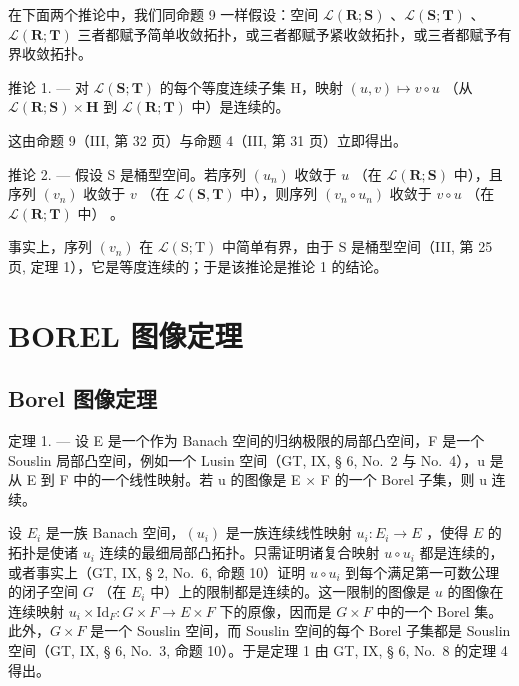 在下面两个推论中，我们同命题 9 一样假设：空间 \(\mathcal{L}(\mathbf{R};\mathbf{S})\) 、\(\mathcal{L}(\mathbf{S};\mathbf{T})\) 、\(\mathcal{L}(\mathbf{R};\mathbf{T})\) 三者都赋予简单收敛拓扑，或三者都赋予紧收敛拓扑，或三者都赋予有界收敛拓扑。

推论 1. --- 对 \(\mathcal{L}(\mathbf{S};\mathbf{T})\) 的每个等度连续子集 H，映射 \((u,v)\mapsto v\circ u\) （从 \(\mathcal{L}(\mathbf{R};\mathbf{S})\times \mathbf{H}\) 到 \(\mathcal{L}(\mathbf{R};\mathbf{T})\) 中）是连续的。

这由命题 9（III, 第 32 页）与命题 4（III, 第 31 页）立即得出。

推论 2. --- 假设 S 是桶型空间。若序列 \((u_n)\) 收敛于 \(u\) （在 \(\mathcal{L}(\mathbf{R};\mathbf{S})\) 中），且序列 \((v_{n})\) 收敛于 \(v\) （在 \(\mathcal{L}(\mathbf{S},\mathbf{T})\) 中），则序列 \((v_{n}\circ u_{n})\) 收敛于 \(v\circ u\) （在 \(\mathcal{L}(\mathbf{R};\mathbf{T})\) 中） 。

事实上，序列 \((v_{n})\) 在 \(\mathcal{L}(\mathrm{S};\mathrm{T})\) 中简单有界，由于 \(\mathrm{S}\) 是桶型空间（III, 第 25 页, 定理 1），它是等度连续的；于是该推论是推论 1 的结论。

\section{BOREL 图像定理}

\subsection{Borel 图像定理}

定理 1. --- 设 E 是一个作为 Banach 空间的归纳极限的局部凸空间，F 是一个 Souslin 局部凸空间，例如一个 Lusin 空间（GT, IX, § 6, No.~2 与 No.~4），u 是从 E 到 F 中的一个线性映射。若 u 的图像是 E × F 的一个 Borel 子集，则 u 连续。

设 \(E_i\) 是一族 Banach 空间，\((u_i)\) 是一族连续线性映射 \(u_i: E_i \to E\) ，使得 \(E\) 的拓扑是使诸 \(u_i\) 连续的最细局部凸拓扑。只需证明诸复合映射 \(u \circ u_i\) 都是连续的，或者事实上（GT, IX, § 2, No.~6, 命题 10）证明 \(u \circ u_i\) 到每个满足第一可数公理的闭子空间 \(G\) （在 \(E_i\) 中）上的限制都是连续的。这一限制的图像是 \(u\) 的图像在连续映射 \(u_i \times \text{Id}_F: G \times F \to E \times F\) 下的原像，因而是 \(G \times F\) 中的一个 Borel 集。此外，\(G \times F\) 是一个 Souslin 空间，而 Souslin 空间的每个 Borel 子集都是 Souslin 空间（GT, IX, § 6, No.~3, 命题 10）。于是定理 1 由 GT, IX, § 6, No.~8 的定理 4 得出。

